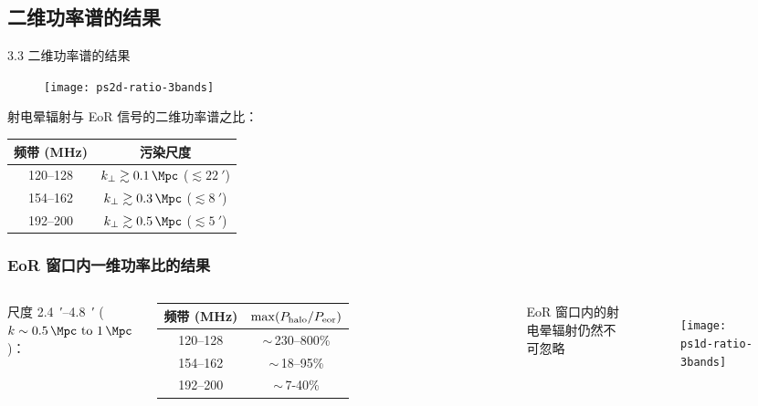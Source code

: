 \documentclass{beamer}
\begin{document}
\subsection{二维功率谱的结果}

\begin{frame}{3.3 二维功率谱的结果}
  \begin{figure}
    \centering
    \texttt{[image: ps2d-ratio-3bands]}
  \end{figure}
  \vspace{-1ex}
  射电晕辐射与 EoR 信号的\alert{二维功率谱之比}：
  \vspace{-0.5ex}
  \begin{table}
    \centering
    \begin{tabular}{cc}
      \toprule
      频带 (\si{\MHz}) & 污染尺度 \\
      \midrule
      120--128 & $k_{\perp} \gtrsim \SI{0.1}{\per\Mpc}$
                 ($\lesssim \SI{22}{\arcminute}$) \\
      154--162 & $k_{\perp} \gtrsim \SI{0.3}{\per\Mpc}$
                 ($\lesssim \SI{8}{\arcminute}$) \\
      192--200 & $k_{\perp} \gtrsim \SI{0.5}{\per\Mpc}$
                 ($\lesssim \SI{5}{\arcminute}$) \\
      \bottomrule
    \end{tabular}
  \end{table}
\end{frame}

\begin{frame}[subsec]
  \frametitle{EoR 窗口内一维功率比的结果}
  \begin{columns}[t,onlytextwidth]
      尺度 \SI{2.4}{\arcminute}--\SI{4.8}{\arcminute}
      ($k \sim \SIrange{0.5}{1}{\per\Mpc}$)：
      \vspace{-1ex}
      \begin{table}
        \small
        \begin{tabular}{cc}
          \toprule
          频带 (\si{\MHz}) & $\max(P_{\text{halo}} / P_{\text{eor}})$ \\
          \midrule
          120--128 & $\sim$\,230--800\% \\
          154--162 & $\sim$\,18--95\% \\
          192--200 & $\sim$\,7-40\% \\
          \bottomrule
        \end{tabular}
      \end{table}
      EoR 窗口内的射电晕辐射仍然不可忽略

    \begin{figure}
      \centering
      \texttt{[image: ps1d-ratio-3bands]}
    \end{figure}
  \end{columns}
\end{frame}
\end{document}
